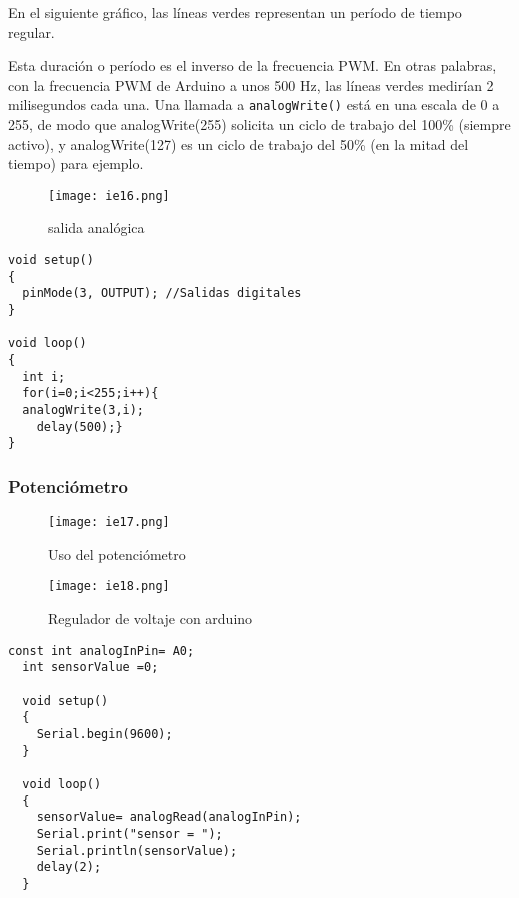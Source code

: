 En el siguiente gráfico, las líneas verdes representan un período de tiempo regular. 

Esta duración o período es el inverso de la frecuencia PWM. En otras palabras, con la frecuencia PWM de Arduino a unos 500 Hz, las líneas verdes medirían 2 milisegundos cada una. Una llamada a \texttt{analogWrite()} está en una escala de 0 a 255, de modo que analogWrite(255) solicita un ciclo de trabajo del 100\% (siempre activo), y analogWrite(127) es un ciclo de trabajo del 50\% (en la mitad del tiempo) para ejemplo.
\begin{figure}[h!]
\centering
  \texttt{[image: ie16.png]}
  \caption{salida analógica}
  \label{ie16}
\end{figure}

\begin{lstlisting}[style=cFrameTB, gobble=4]
void setup()
{
  pinMode(3, OUTPUT); //Salidas digitales
}

void loop()
{
  int i;
  for(i=0;i<255;i++){
  analogWrite(3,i);
    delay(500);}
}
\end{lstlisting}


\subsubsection{Potenciómetro}

\begin{figure}[h!]
\centering
  \texttt{[image: ie17.png]}
  \caption{Uso del potenciómetro}
  \label{ie17}
\end{figure}
\begin{figure}[h!]
  \centering
    \texttt{[image: ie18.png]}
    \caption{Regulador de voltaje con arduino}
    \label{ie18}
  \end{figure}
  
\begin{lstlisting}[style=cFrameTB, gobble=4]
  const int analogInPin= A0;
  int sensorValue =0;
  
  void setup()
  {
    Serial.begin(9600);
  }
  
  void loop()
  {
    sensorValue= analogRead(analogInPin);
    Serial.print("sensor = ");
    Serial.println(sensorValue);
    delay(2);
  }
\end{lstlisting}
